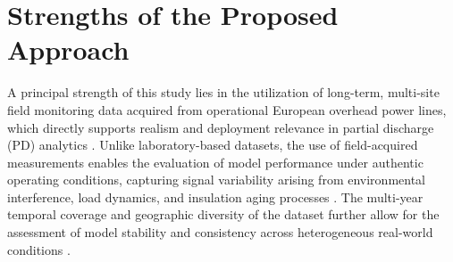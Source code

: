 

\section{Strengths of the Proposed Approach}

A principal strength of this study lies in the utilization of long-term, multi-site field monitoring data acquired from operational European overhead power lines, which directly supports realism and deployment relevance in partial discharge (PD) analytics \parencite{Florkowski_2024, Sikorski_2025}. 
Unlike laboratory-based datasets, the use of field-acquired measurements enables the evaluation of model performance under authentic operating conditions, capturing signal variability arising from environmental interference, load dynamics, and insulation aging processes \parencite{Orellana_2023_1, Florkowski_2024}. 
The multi-year temporal coverage and geographic diversity of the dataset further allow for the assessment of model stability and consistency across heterogeneous real-world conditions \parencite{Seitz_2024_1, Sikorski_2025}.

